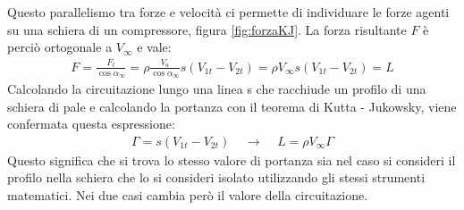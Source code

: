 Questo parallelismo tra forze e velocità ci permette di individuare le forze agenti su una schiera di un compressore, figura \ref{fig:forzaKJ}. La forza risultante $F$ è perciò ortogonale a $V_\infty$ e vale:
\begin{align*}
F=\frac{F_t}{\cos \alpha_{\infty}}=\rho \frac{V_a}{\cos \alpha_{\infty}}s(V_{1t}-V_{2t})=\rho V_\infty s (V_{1t}-V_{2t})=L
\end{align*}
Calcolando la circuitazione lungo una linea s che racchiude un profilo di una schiera di pale e calcolando la portanza con il teorema di Kutta - Jukowsky, viene confermata questa espressione:
\begin{align*}
\Gamma=s(V_{1t}-V_{2t}) \;\;\;\; \rightarrow \;\;\;\; L=\rho V_\infty \Gamma
\end{align*}
Questo significa che si trova lo stesso valore di portanza sia nel caso si consideri il profilo nella schiera che lo si consideri isolato utilizzando gli stessi strumenti matematici. Nei due casi cambia però il valore della circuitazione.

